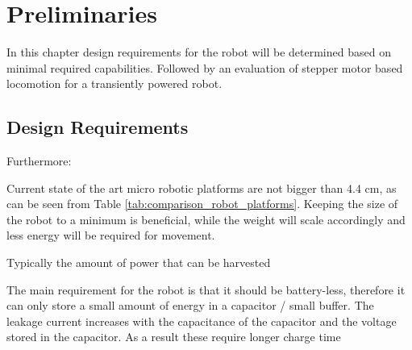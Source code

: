 \chapter{Preliminaries}

In this chapter design requirements for the robot will be determined based on minimal required capabilities. 
Followed by an evaluation of stepper motor based locomotion for a transiently powered robot.

\section{Design Requirements}
\label{sec:design_requirements}






Furthermore:



Current state of the art micro robotic platforms are not bigger than 4.4 cm, as can be seen from Table \ref{tab:comparison_robot_platforms}.
Keeping the size of the robot to a minimum is beneficial, while the weight will scale accordingly and less energy will be required for movement.



Typically the amount of power that can be harvested 

The main requirement for the robot is that it should be battery-less, therefore it can only store a small amount of energy in a capacitor / small buffer.
The leakage current increases with the capacitance of the capacitor and the voltage stored in the capacitor.
As a result these require longer charge time

